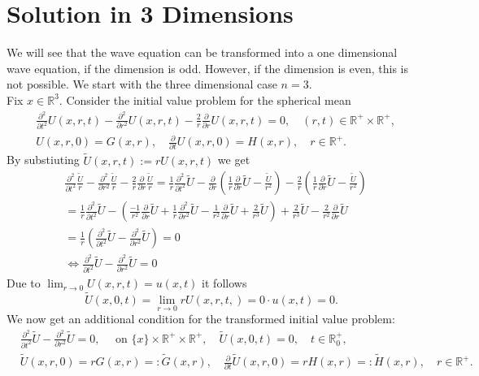 \documentclass[A4,12pt,twoside]{book}
\begin{document}
\section{Solution in 3 Dimensions}
We will see that the wave equation can be transformed into a one dimensional wave equation, if the dimension is odd. However, if the dimension is even, this is not possible. We start with the three dimensional case $n=3$.\\
Fix $x \in \mathbb{R}^3$. Consider the initial value problem for the spherical mean
\begin{align*}
    & \frac{\partial^2}{\partial t^2} U(x,r,t) - \frac{\partial^2}{\partial r^2} U(x,r,t) - \frac{2}{r} \frac{\partial}{\partial r} U(x,r,t) =0, \quad (r,t) \in \mathbb{R}^+ \times \mathbb{R}^+ ,\\
    & U(x,r,0) = G(x,r), \quad \frac{\partial}{\partial t} U(x,r,0) = H(x,r), \quad r \in \mathbb{R}^+.
\end{align*}
By substiuting $ \tilde{U} (x,r,t) := r U(x,r,t)$ we get
\begin{align*}
    & \frac{\partial^2}{\partial t^2} \frac{\tilde{U}}{r} - \frac{\partial^2}{\partial r^2} \frac{\tilde{U}}{r} - \frac{2}{r} \frac{\partial}{\partial r} \frac{\tilde{U}}{r} = \frac{1}{r} \frac{\partial^2}{\partial t^2} \tilde{U} - \frac{\partial}{\partial r} \left( \frac{1}{r} \frac{\partial}{\partial r} \tilde{U} - \frac{\tilde{U}}{r^2} \right) - \frac{2}{r} \left( \frac{1}{r} \frac{\partial}{\partial r} \tilde{U} - \frac{\tilde{U}}{r^2} \right) \\
    &= \frac{1}{r} \frac{\partial^2}{\partial t^2} \tilde{U} - \left( \frac{-1}{r^2} \frac{\partial}{\partial r} \tilde{U} + \frac{1}{r} \frac{\partial^2}{\partial r^2} \tilde{U} - \frac{1}{r^2} \frac{\partial}{\partial r} \tilde{U} + \frac{2}{r^3} \tilde{U}  \right) + \frac{2}{r^3} \tilde{U} - \frac{2}{r^2} \frac{\partial}{\partial r} \tilde{U} \\
    &= \frac{1}{r} \left( \frac{\partial^2}{\partial t^2} \tilde{U} - \frac{\partial^2}{\partial r^2} \tilde{U} \right) =0\\
    &\iff  \frac{\partial^2}{\partial t^2} \tilde{U} - \frac{\partial^2}{\partial r^2} \tilde{U}  =0
\end{align*}
Due to $\lim_{r \to 0} U(x,r,t) =u(x,t)$ it follows 
\[
\tilde{U} (x,0,t) = \lim_{r \to 0} r U(x,r,t,) =0 \cdot u(x,t)=0.
\]
We now get an additional condition for the transformed initial value problem:
\begin{align*}
    & \frac{\partial^2}{\partial t^2} \tilde{U} - \frac{\partial^2}{\partial r^2} \tilde{U} =0, \quad \text{ on } \{x\} \times \mathbb{R}^+ \times \mathbb{R}^+, \quad \tilde{U}(x,0,t) =0, \quad t \in \mathbb{R}_0^+ ,\\
    & \tilde{U}(x,r,0) = r G(x,r)=: \tilde{G}(x,r), \quad \frac{\partial}{\partial t} \tilde{U}(x,r,0) = r H(x,r) =: \tilde{H}(x,r), \quad r \in \mathbb{R}^+.
\end{align*}
\end{document}
